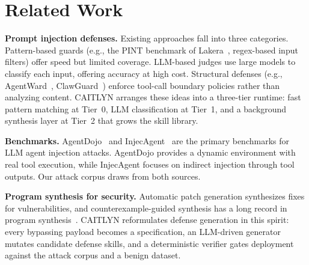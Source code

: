 \section{Related Work}

\textbf{Prompt injection defenses.} Existing approaches fall into three categories. Pattern-based guards (e.g., the PINT benchmark of Lakera~\cite{pint}, regex-based input filters) offer speed but limited coverage. LLM-based judges use large models to classify each input, offering accuracy at high cost. Structural defenses (e.g., AgentWard~\cite{agentward}, ClawGuard~\cite{clawguard}) enforce tool-call boundary policies rather than analyzing content. CAITLYN arranges these ideas into a three-tier runtime: fast pattern matching at Tier~0, LLM classification at Tier~1, and a background synthesis layer at Tier~2 that grows the skill library.

\textbf{Benchmarks.} AgentDojo~\cite{agentdojo} and InjecAgent~\cite{injecagent} are the primary benchmarks for LLM agent injection attacks. AgentDojo provides a dynamic environment with real tool execution, while InjecAgent focuses on indirect injection through tool outputs. Our attack corpus draws from both sources.

\textbf{Program synthesis for security.} Automatic patch generation synthesizes fixes for vulnerabilities, and counterexample-guided synthesis has a long record in program synthesis~\cite{sketch2006,sygus2013,flashfill2011}. CAITLYN reformulates defense generation in this spirit: every bypassing payload becomes a specification, an LLM-driven generator mutates candidate defense skills, and a deterministic verifier gates deployment against the attack corpus and a benign dataset.
